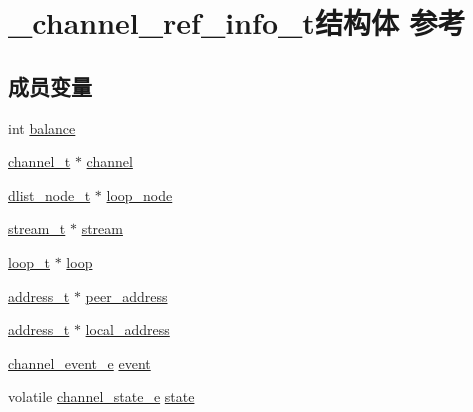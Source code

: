 \hypertarget{a00004}{}\section{\+\_\+channel\+\_\+ref\+\_\+info\+\_\+t结构体 参考}
\label{a00004}
\subsection*{成员变量}
\begin{DoxyCompactItemize}
\item 
int \hyperlink{a00004_a99bd34912f0ef9a5cdacd9df9c355ce5_a99bd34912f0ef9a5cdacd9df9c355ce5}{balance}
\item 
\hyperlink{a00050_a2effb3e20d0b7e5f6d5ac42118e0330b_a2effb3e20d0b7e5f6d5ac42118e0330b}{channel\+\_\+t} $\ast$ \hyperlink{a00004_a441b774dd529abf1712e5e69287658ba_a441b774dd529abf1712e5e69287658ba}{channel}
\item 
\hyperlink{a00050_a62053232bcf3566010ef98a7d77c3cc8_a62053232bcf3566010ef98a7d77c3cc8}{dlist\+\_\+node\+\_\+t} $\ast$ \hyperlink{a00004_a70fa475c90dda9133dfaa9fdcb79e958_a70fa475c90dda9133dfaa9fdcb79e958}{loop\+\_\+node}
\item 
\hyperlink{a00050_a261dba04f46f5c59a68a05f69f5a65a8_a261dba04f46f5c59a68a05f69f5a65a8}{stream\+\_\+t} $\ast$ \hyperlink{a00004_a27701935d3cd7358a0b92b3495afce7f_a27701935d3cd7358a0b92b3495afce7f}{stream}
\item 
\hyperlink{a00050_a9c3ad1cd2de83e09f3a7b59fa82c94ee_a9c3ad1cd2de83e09f3a7b59fa82c94ee}{loop\+\_\+t} $\ast$ \hyperlink{a00004_a6f756b85f16f61be42aa47e79ed836a9_a6f756b85f16f61be42aa47e79ed836a9}{loop}
\item 
\hyperlink{a00050_a7a6e75b85c8b441f843bd40004a7d9d5_a7a6e75b85c8b441f843bd40004a7d9d5}{address\+\_\+t} $\ast$ \hyperlink{a00004_ab97c60bda3feaabb2e1329318a7e1898_ab97c60bda3feaabb2e1329318a7e1898}{peer\+\_\+address}
\item 
\hyperlink{a00050_a7a6e75b85c8b441f843bd40004a7d9d5_a7a6e75b85c8b441f843bd40004a7d9d5}{address\+\_\+t} $\ast$ \hyperlink{a00004_a250e85c925e44e72600c9d662c0d328d_a250e85c925e44e72600c9d662c0d328d}{local\+\_\+address}
\item 
\hyperlink{a00050_a5ad43ab162fdf9ad53cde10ed3d87d99_a5ad43ab162fdf9ad53cde10ed3d87d99}{channel\+\_\+event\+\_\+e} \hyperlink{a00004_a61224f966c4df759a33ba36b43556b1c_a61224f966c4df759a33ba36b43556b1c}{event}
\item 
volatile \hyperlink{a00050_a1956eea3012f780b5d592a9d09d9873c_a1956eea3012f780b5d592a9d09d9873c}{channel\+\_\+state\+\_\+e} \hyperlink{a00004_ae42dcee90ddf852cdbd17ed254973f04_ae42dcee90ddf852cdbd17ed254973f04}{state}

\end{DoxyCompactItemize}

